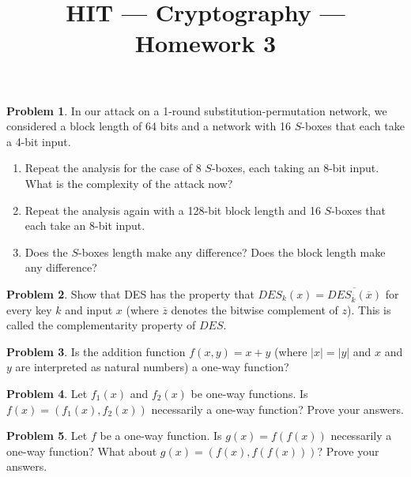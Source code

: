 \documentclass[11pt]{article}
\title{HIT --- Cryptography --- Homework 3}
\theoremstyle{definition}
\newtheorem{problem}{Problem}
\begin{document}
\maketitle

\begin{problem}
In our attack on a 1-round substitution-permutation network, we considered a block length of 64 bits and a network with 16 $S$-boxes that each take a 4-bit input. 
\begin{enumerate}
\item Repeat the analysis for the case of 8 $S$-boxes, each taking an 8-bit input. What is the complexity of the attack now?
\item Repeat the analysis again with a 128-bit block length and 16 $S$-boxes that each take an 8-bit input.
\item Does the $S$-boxes length make any difference? Does the block length make any difference?
\end{enumerate}
\end{problem}

\begin{problem}
Show that DES has the property that $DES_k(x) = \overline{DES_{\overline{k}}(\overline{x})}$ for every key $k$ and input $x$ (where $\overline{z}$ denotes the bitwise complement of $z$). This is called the complementarity property of $DES$.
\end{problem}

\begin{problem}
Is the addition function $f(x, y) = x + y$ (where $|x| = |y|$ and $x$ and $y$ are interpreted as natural numbers) a one-way function?
\end{problem}

\begin{problem}
Let $f_{1}(x)$ and $f_{2}(x)$ be one-way functions. Is $f(x) = (f_{1}(x), f_{2}(x))$ necessarily a one-way function? Prove your answers.
\end{problem}

\begin{problem}
Let $f$ be a one-way function. Is $g(x) = f(f(x))$ necessarily a one-way function? What about $g(x) = (f(x),f(f(x)))$? Prove your answers.
\end{problem}
\end{document}
